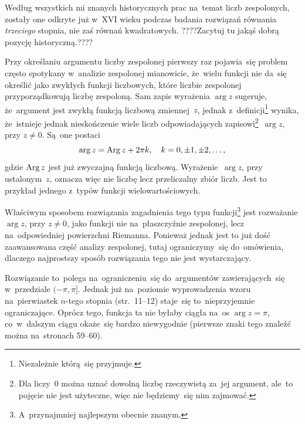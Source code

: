 \documentclass[a4paper,11pt]{article}
\numberwithin{equation}{section}
\begin{document}
\VerSpaceFour





\noindent
{} Według wszystkich mi znanych historycznych prac na~temat liczb
zespolonych, zostały one odkryte już w~XVI wieku podczas badania rozwiązań
równania \textit{trzeciego} stopnia, nie zaś równań kwadratowych.
????Zacytuj tu jakąś dobrą pozycję historyczną.????

\VerSpaceFour





\noindent
{} Przy określaniu argumentu liczby zespolonej pierwszy
raz pojawia~się problem często spotykany w~analizie zespolonej
mianowicie, że~wielu funkcji nie da~się określić jako zwykłych funkcji
liczbowych, które liczbie zespolonej przyporządkowują liczbę
zespoloną. Sam zapis wyrażenia $\arg z$ sugeruje, że~argument jest
zwykłą funkcją liczbową zmiennej~$z$, jednak
z~definicji\footnote{Niezależnie którą~się przyjmuje.} wynika,
że~istnieje jednak nieskończenie wiele liczb odpowiadających
zapisowi\footnote{Dla liczy~$0$ można uznać dowolną liczbę rzeczywistą
  za~jej argument, ale~to pojęcie nie jest użyteczne, więc nie
  będziemy~się nim zajmować.}~$\arg z$, przy $z \neq 0$. Są~one postaci
\begin{equation}
  \label{eq:Leja-Funkcje-zespolone-07}
  \arg z = \operatorname{Arg} z + 2\pi k, \quad k = 0, \pm 1, \pm 2, \ldots,
\end{equation}
gdzie $\operatorname{Arg} z$ jest już zwyczajną funkcją liczbową.
Wyrażenie~$\arg z$, przy ustalonym~$z$, oznacza więc nie liczbę lecz
przeliczalny zbiór liczb. Jest to przykład jednego z~typów funkcji
wielowartościowych.

Właściwym sposobem rozwiązania zagadnienia tego typu
funkcji\footnote{A~przynajmniej najlepszym obecnie znanym.} jest
rozważanie $\arg z$, przy $z \neq 0$, jako funkcji nie na~płaszczyźnie
zespolonej, lecz na~odpowiedniej powierzchni Riemanna. Ponieważ jednak
jest to już dość zaawansowana część analizy zespolonej, tutaj
ograniczymy~się do~omówienia, dlaczego najprostszy sposób rozwiązania
tego nie jest wystarczający.

Rozwiązanie to~polega na~ograniczeniu~się do~argumentów
zawierających~się w~przedziale $( -\pi, \pi ]$. Jednak już na~poziomie
wyprowadzenia wzoru na~pierwiastek $n$-tego stopnia (str.~11--12)
staje~się to~nieprzyjemnie ograniczające. Oprócz tego, funkcja ta nie
byłaby ciągła na~os $\arg z = \pi$, co~w~dalszym ciągu okaże~się
bardzo niewygodnie (pierwsze znaki tego znaleźć można na~stronach
59--60).
\end{document}
